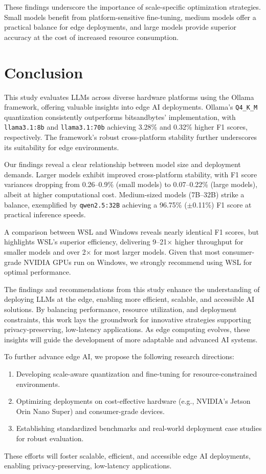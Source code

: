 \documentclass[conference]{IEEEtran}
\begin{document}
These findings underscore the importance of scale-specific optimization strategies. Small models benefit from platform-sensitive fine-tuning, medium models offer a practical balance for edge deployments, and large models provide superior accuracy at the cost of increased resource consumption.

\section{Conclusion}

This study evaluates LLMs across diverse hardware platforms using the Ollama framework, offering valuable insights into edge AI deployments. Ollama’s \texttt{Q4\_K\_M} quantization consistently outperforms bitsandbytes’ implementation, with \texttt{llama3.1:8b} and \texttt{llama3.1:70b} achieving 3.28\% and 0.32\% higher F1 scores, respectively. The framework’s robust cross-platform stability further underscores its suitability for edge environments.

Our findings reveal a clear relationship between model size and deployment demands. Larger models exhibit improved cross-platform stability, with F1 score variances dropping from 0.26–0.9\% (small models) to 0.07–0.22\% (large models), albeit at higher computational cost. Medium-sized models (7B–32B) strike a balance, exemplified by \texttt{qwen2.5:32B} achieving a 96.75\% ($\pm$0.11\%) F1 score at practical inference speeds.

A comparison between WSL and Windows reveals nearly identical F1 scores, but highlights WSL’s superior efficiency, delivering 9–21× higher throughput for smaller models and over 2× for most larger models. Given that most consumer-grade NVIDIA GPUs run on Windows, we strongly recommend using WSL for optimal performance.

The findings and recommendations from this study enhance the understanding of deploying LLMs at the edge, enabling more efficient, scalable, and accessible AI solutions. By balancing performance, resource utilization, and deployment constraints, this work lays the groundwork for innovative strategies supporting privacy-preserving, low-latency applications. As edge computing evolves, these insights will guide the development of more adaptable and advanced AI systems.

To further advance edge AI, we propose the following research directions:

\begin{enumerate}
    \item Developing scale-aware quantization and fine-tuning for resource-constrained environments.
    \item Optimizing deployments on cost-effective hardware (e.g., NVIDIA’s Jetson Orin Nano Super) and consumer-grade devices.
    \item Establishing standardized benchmarks and real-world deployment case studies for robust evaluation.
\end{enumerate}

These efforts will foster scalable, efficient, and accessible edge AI deployments, enabling privacy-preserving, low-latency applications.




\end{document}
